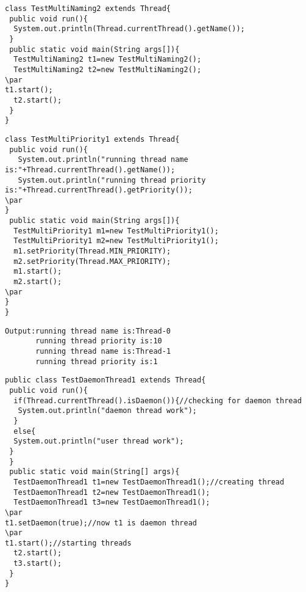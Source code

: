 \documentclass{book}
\def\lthtmlcheckvsize{\ifdim\ht\sizebox<\vsize 
  \ifdim\wd\sizebox<\hsize\expandafter\hfill\fi \expandafter\vfill
  \else\expandafter\vss\fi}%
\begin{document}
{\newpage\clearpage
{}%
\begin{lstlisting}
class TestMultiNaming2 extends Thread{  
 public void run(){  
  System.out.println(Thread.currentThread().getName());  
 }  
 public static void main(String args[]){  
  TestMultiNaming2 t1=new TestMultiNaming2();  
  TestMultiNaming2 t2=new TestMultiNaming2();  
\par
t1.start();  
  t2.start();  
 }  
}  
\end{lstlisting}%
\lthtmlfigureZ
\lthtmlcheckvsize\clearpage}

{\newpage\clearpage
{}%
\begin{lstlisting}
class TestMultiPriority1 extends Thread{  
 public void run(){  
   System.out.println("running thread name is:"+Thread.currentThread().getName());  
   System.out.println("running thread priority is:"+Thread.currentThread().getPriority());  
\par
}  
 public static void main(String args[]){  
  TestMultiPriority1 m1=new TestMultiPriority1();  
  TestMultiPriority1 m2=new TestMultiPriority1();  
  m1.setPriority(Thread.MIN_PRIORITY);  
  m2.setPriority(Thread.MAX_PRIORITY);  
  m1.start();  
  m2.start();  
\par
}  
}     
\end{lstlisting}%
\lthtmlfigureZ
\lthtmlcheckvsize\clearpage}

{\newpage\clearpage
{}%
\begin{lstlisting}
Output:running thread name is:Thread-0
       running thread priority is:10
       running thread name is:Thread-1
       running thread priority is:1
\end{lstlisting}%
\lthtmlfigureZ
\lthtmlcheckvsize\clearpage}

{\newpage\clearpage
{}%
\begin{lstlisting}
public class TestDaemonThread1 extends Thread{  
 public void run(){  
  if(Thread.currentThread().isDaemon()){//checking for daemon thread  
   System.out.println("daemon thread work");  
  }  
  else{  
  System.out.println("user thread work");  
 }  
 }  
 public static void main(String[] args){  
  TestDaemonThread1 t1=new TestDaemonThread1();//creating thread  
  TestDaemonThread1 t2=new TestDaemonThread1();  
  TestDaemonThread1 t3=new TestDaemonThread1();  
\par
t1.setDaemon(true);//now t1 is daemon thread  
\par
t1.start();//starting threads  
  t2.start();  
  t3.start();  
 }  
}  
\end{lstlisting}%
\lthtmlfigureZ
\lthtmlcheckvsize\clearpage}
\end{document}
